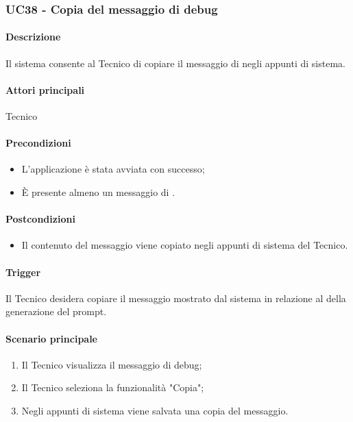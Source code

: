 \subsubsection{UC38 - Copia del messaggio di debug}\label{UC38}

\paragraph*{Descrizione}
Il sistema consente al Tecnico di copiare il messaggio di  negli appunti di sistema.

\paragraph*{Attori principali}
Tecnico

\paragraph*{Precondizioni}
\begin{itemize}
  \item L'applicazione è stata avviata con successo;
  \item È presente almeno un messaggio di .  
\end{itemize}

\paragraph*{Postcondizioni}
\begin{itemize}
  \item Il contenuto del messaggio viene copiato negli appunti di sistema del Tecnico.
\end{itemize}

\paragraph*{Trigger}
Il Tecnico desidera copiare il messaggio mostrato dal sistema in relazione al  della generazione del prompt.

\paragraph*{Scenario principale}
\begin{enumerate}
  \item Il Tecnico visualizza il messaggio di debug;
  \item Il Tecnico seleziona la funzionalità "Copia";
  \item Negli appunti di sistema viene salvata una copia del messaggio.
\end{enumerate}